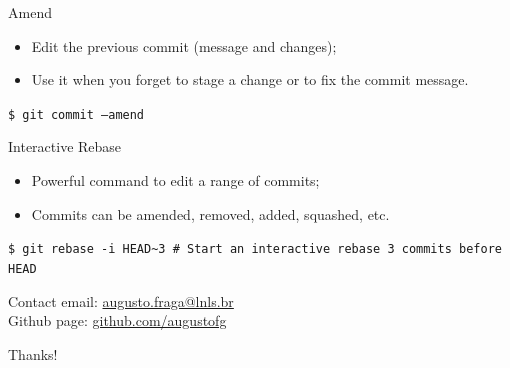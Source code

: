 \documentclass{beamer}
\begin{document}
\begin{frame}{Amend}
  \begin{itemize}
    \item Edit the previous commit (message and changes);
    \item Use it when you forget to stage a change or to fix the commit message.
  \end{itemize}
  \begin{block}{}
    \texttt{\$ git commit --amend}
  \end{block}
\end{frame}

\begin{frame}{Interactive Rebase}
  \begin{itemize}
    \item Powerful command to edit a range of commits;
    \item Commits can be amended, removed, added, squashed, etc.
  \end{itemize}
  \begin{block}{}
    \texttt{\$ git rebase -i HEAD\textasciitilde{}3 \# Start an interactive rebase 3 commits before HEAD}
  \end{block}
\end{frame}

\begin{frame}{Contact}
  email: \href{mailto:augusto.fraga@lnls.br}{augusto.fraga@lnls.br} \\
  Github page: \url{github.com/augustofg} \\
  \begin{center}
    Thanks!
  \end{center}
\end{frame}
\end{document}
